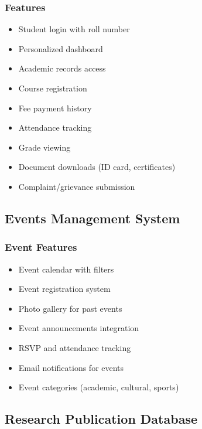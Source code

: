 \documentclass[12pt,a4paper]{report}
\begin{document}
\subsubsection*{Features}
\begin{itemize}
    \item Student login with roll number
    \item Personalized dashboard
    \item Academic records access
    \item Course registration
    \item Fee payment history
    \item Attendance tracking
    \item Grade viewing
    \item Document downloads (ID card, certificates)
    \item Complaint/grievance submission
\end{itemize}

\subsection{Events Management System}

\subsubsection*{Event Features}
\begin{itemize}
    \item Event calendar with filters
    \item Event registration system
    \item Photo gallery for past events
    \item Event announcements integration
    \item RSVP and attendance tracking
    \item Email notifications for events
    \item Event categories (academic, cultural, sports)
\end{itemize}

\subsection{Research Publication Database}
\end{document}
